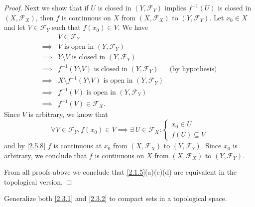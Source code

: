 \begin{proof}
  Next we show that if \(U\) is closed in \((Y, \mathcal{F}_Y)\) implies \(f^{-1}(U)\) is closed in \((X, \mathcal{F}_X)\), then \(f\) is continuous on \(X\) from \((X, \mathcal{F}_X)\) to \((Y, \mathcal{F}_Y)\).
  Let \(x_0 \in X\) and let \(V \in \mathcal{F}_Y\) such that \(f(x_0) \in V\).
  We have
  \begin{align*}
             & V \in \mathcal{F}_Y                                                                               \\
    \implies & V \text{ is open in } (Y, \mathcal{F}_Y)                                                          \\
    \implies & Y \setminus V \text{ is closed in } (Y, \mathcal{F}_Y)                                            \\
    \implies & f^{-1}(Y \setminus V) \text{ is closed in } (Y, \mathcal{F}_Y)           & \text{(by hypothesis)} \\
    \implies & X \setminus f^{-1}(Y \setminus V) \text{ is open in } (Y, \mathcal{F}_Y)                          \\
    \implies & f^{-1}(V) \text{ is open in } (Y, \mathcal{F}_Y)                                                  \\
    \implies & f^{-1}(V) \in \mathcal{F}_X.
  \end{align*}
  Since \(V\) is arbitrary, we know that
  \[
    \forall V \in \mathcal{F}_Y, f(x_0) \in V \implies \exists\ U \in \mathcal{F}_X : \begin{cases}
      x_0 \in U \\
      f(U) \subseteq V
    \end{cases}
  \]
  and by \cref{2.5.8} \(f\) is continuous at \(x_0\) from \((X, \mathcal{F}_X)\) to \((Y, \mathcal{F}_Y)\).
  Since \(x_0\) is arbitrary, we conclude that \(f\) is continuous on \(X\) from \((X, \mathcal{F}_X)\) to \((Y, \mathcal{F}_Y)\).

  From all proofs above we conclude that \cref{2.1.5}(a)(c)(d) are equivalent in the topological version.
\end{proof}

\begin{ex}\label{ex:2.5.17}
  Generalize both \cref{2.3.1} and \cref{2.3.2} to compact sets in a topological space.
\end{ex}


